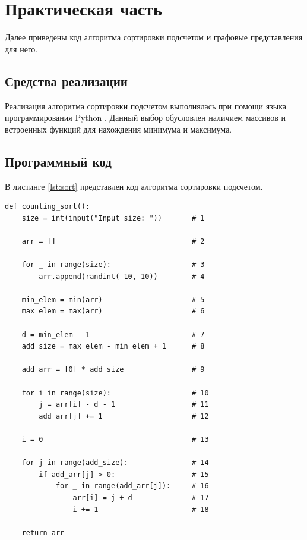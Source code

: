 \chapter{Практическая часть}

Далее приведены код алгоритма сортировки подсчетом \cite{sort} и графовые представления для него.

\section{Средства реализации}

Реализация алгоритма сортировки подсчетом выполнялась при помощи языка программирования Python \cite{python}. Данный выбор обусловлен наличием массивов и встроенных функций для нахождения минимума и максимума.

\section{Программный код}

В листинге \ref{lst:sort} представлен код алгоритма сортировки подсчетом.
\clearpage
\begin{center}
\captionsetup{justification=raggedright,singlelinecheck=off}
\begin{lstlisting}[label=lst:sort,caption=Сортировка подсчетом]
def counting_sort():
    size = int(input("Input size: "))       # 1

    arr = []                                # 2

    for _ in range(size):                   # 3
        arr.append(randint(-10, 10))        # 4

    min_elem = min(arr)                     # 5
    max_elem = max(arr)                     # 6
    
    d = min_elem - 1                        # 7
    add_size = max_elem - min_elem + 1      # 8

    add_arr = [0] * add_size                # 9

    for i in range(size):                   # 10
        j = arr[i] - d - 1                  # 11
        add_arr[j] += 1                     # 12
    
    i = 0                                   # 13

    for j in range(add_size):               # 14
        if add_arr[j] > 0:                  # 15
            for _ in range(add_arr[j]):     # 16
                arr[i] = j + d              # 17
                i += 1                      # 18

    return arr
\end{lstlisting} 
\end{center}


